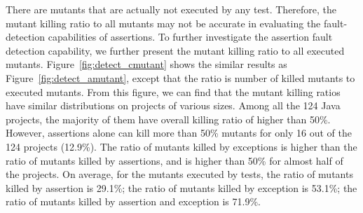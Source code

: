 There are mutants that are actually not executed by any
test. Therefore, the mutant killing ratio to all mutants may not be
accurate in evaluating the fault-detection capabilities of
assertions. To further investigate the assertion fault detection
capability, we further present the mutant killing ratio to all
executed mutants.  Figure~\ref{fig:detect_cmutant} shows the similar
results as Figure~\ref{fig:detect_amutant}, except that the ratio is
number of killed mutants to executed mutants.  From this figure, we
can find that the mutant killing ratios have similar distributions on
projects of various sizes. Among all the 124 Java projects, the
majority of them have overall killing ratio of higher than
50\%. However, assertions alone can kill more than 50\% mutants for
only 16 out of the 124 projects (12.9\%). The ratio of mutants killed
by exceptions is higher than the ratio of mutants killed by
assertions, and is higher than 50\% for almost half of the projects.
On average, for the mutants executed by tests, the ratio of mutants
killed by assertion is 29.1\%; the ratio of mutants killed by
exception is 53.1\%; the ratio of mutants killed by assertion and
exception is 71.9\%.

\begin{comment}
 Some large projects have very small
kill ratio.  That implies a lot of mutants are covered, and this
phenomenon is much more common in large projects than small projects,
as the same finding in the Figure~\ref{fig:assert_test}. Projects
which contain large SLOC kill less mutants indicates that low ratio of
assertion per test case.

  The top line denotes the ratio of mutants killed
by assertion and exception.
\end{comment}



\noindent
{}



